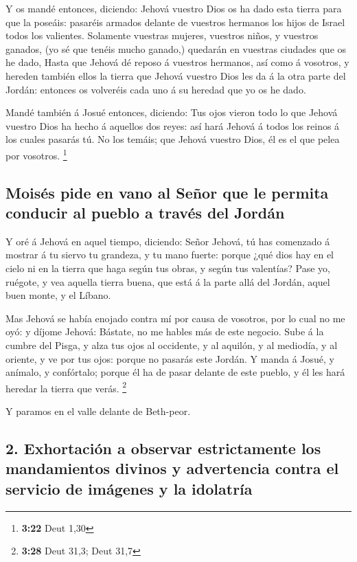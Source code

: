  Y os mandé entonces, diciendo: Jehová vuestro Dios os ha
dado esta tierra para que la poseáis: pasaréis armados delante de
vuestros hermanos los hijos de Israel todos los valientes. 
Solamente vuestras mujeres, vuestros niños, y vuestros ganados, (yo sé
que tenéis mucho ganado,) quedarán en vuestras ciudades que os he dado,
 Hasta que Jehová dé reposo á vuestros hermanos, así como á
vosotros, y hereden también ellos la tierra que Jehová vuestro Dios les
da á la otra parte del Jordán: entonces os volveréis cada uno á su
heredad que yo os he dado.

 Mandé también á Josué entonces, diciendo: Tus ojos vieron
todo lo que Jehová vuestro Dios ha hecho á aquellos dos reyes: así hará
Jehová á todos los reinos á los cuales pasarás tú.  No los
temáis; que Jehová vuestro Dios, él es el que pelea por vosotros.
\footnote{\textbf{3:22} Deut 1,30}

\hypertarget{moisuxe9s-pide-en-vano-al-seuxf1or-que-le-permita-conducir-al-pueblo-a-travuxe9s-del-jorduxe1n}{%
\subsection{Moisés pide en vano al Señor que le permita conducir al
pueblo a través del
Jordán}\label{moisuxe9s-pide-en-vano-al-seuxf1or-que-le-permita-conducir-al-pueblo-a-travuxe9s-del-jorduxe1n}}

 Y oré á Jehová en aquel tiempo, diciendo: 
Señor Jehová, tú has comenzado á mostrar á tu siervo tu grandeza, y tu
mano fuerte: porque ¿qué dios hay en el cielo ni en la tierra que haga
según tus obras, y según tus valentías?  Pase yo, ruégote,
y vea aquella tierra buena, que está á la parte allá del Jordán, aquel
buen monte, y el Líbano.

 Mas Jehová se había enojado contra mí por causa de
vosotros, por lo cual no me oyó: y díjome Jehová: Bástate, no me hables
más de este negocio.  Sube á la cumbre del Pisga, y alza
tus ojos al occidente, y al aquilón, y al mediodía, y al oriente, y ve
por tus ojos: porque no pasarás este Jordán.  Y manda á
Josué, y anímalo, y confórtalo; porque él ha de pasar delante de este
pueblo, y él les hará heredar la tierra que verás. \footnote{\textbf{3:28}
  Deut 31,3; Deut 31,7}

 Y paramos en el valle delante de Beth-peor.

\hypertarget{exhortaciuxf3n-a-observar-estrictamente-los-mandamientos-divinos-y-advertencia-contra-el-servicio-de-imuxe1genes-y-la-idolatruxeda}{%
\subsection{2. Exhortación a observar estrictamente los mandamientos
divinos y advertencia contra el servicio de imágenes y la
idolatría}\label{exhortaciuxf3n-a-observar-estrictamente-los-mandamientos-divinos-y-advertencia-contra-el-servicio-de-imuxe1genes-y-la-idolatruxeda}}

